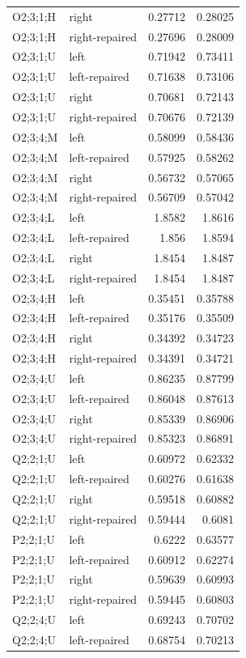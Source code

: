 {\begin{longtable}{@{}llrr@{}}
O2;3;1;H & right & 0.27712 & 0.28025 \\
O2;3;1;H & right-repaired & 0.27696 & 0.28009 \\
O2;3;1;U & left & 0.71942 & 0.73411 \\
O2;3;1;U & left-repaired & 0.71638 & 0.73106 \\
O2;3;1;U & right & 0.70681 & 0.72143 \\
O2;3;1;U & right-repaired & 0.70676 & 0.72139 \\
O2;3;4;M & left & 0.58099 & 0.58436 \\
O2;3;4;M & left-repaired & 0.57925 & 0.58262 \\
O2;3;4;M & right & 0.56732 & 0.57065 \\
O2;3;4;M & right-repaired & 0.56709 & 0.57042 \\
O2;3;4;L & left & 1.8582 & 1.8616 \\
O2;3;4;L & left-repaired & 1.856 & 1.8594 \\
O2;3;4;L & right & 1.8454 & 1.8487 \\
O2;3;4;L & right-repaired & 1.8454 & 1.8487 \\
O2;3;4;H & left & 0.35451 & 0.35788 \\
O2;3;4;H & left-repaired & 0.35176 & 0.35509 \\
O2;3;4;H & right & 0.34392 & 0.34723 \\
O2;3;4;H & right-repaired & 0.34391 & 0.34721 \\
O2;3;4;U & left & 0.86235 & 0.87799 \\
O2;3;4;U & left-repaired & 0.86048 & 0.87613 \\
O2;3;4;U & right & 0.85339 & 0.86906 \\
O2;3;4;U & right-repaired & 0.85323 & 0.86891 \\
Q2;2;1;U & left & 0.60972 & 0.62332 \\
Q2;2;1;U & left-repaired & 0.60276 & 0.61638 \\
Q2;2;1;U & right & 0.59518 & 0.60882 \\
Q2;2;1;U & right-repaired & 0.59444 & 0.6081 \\
P2;2;1;U & left & 0.6222 & 0.63577 \\
P2;2;1;U & left-repaired & 0.60912 & 0.62274 \\
P2;2;1;U & right & 0.59639 & 0.60993 \\
P2;2;1;U & right-repaired & 0.59445 & 0.60803 \\
Q2;2;4;U & left & 0.69243 & 0.70702 \\
Q2;2;4;U & left-repaired & 0.68754 & 0.70213 \\

\end{longtable}}

